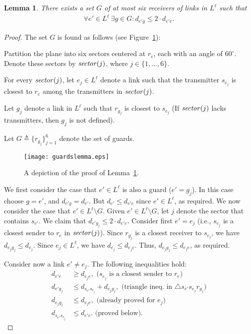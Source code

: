 \documentclass[11pt]{article}
\newenvironment{proof sketch}{\noindent {\bf Proof sketch:} }{\hfill \qed}
\newtheorem{lemma}{Lemma}
\newcommand{\sector}{\text{\emph{sector}}}
\newcommand{\eqdf}{\triangleq}
\begin{document}
\begin{lemma}\label{lem:guards}
  There exists a set $G$ of at most six receivers of links in
  $L^{\ell}$ such that
\begin{align*}
\forall e' \in L^{\ell}~ \exists g \in G : d_{e'g} \leq 2\cdot d_{e'e}.
\end{align*}
\end{lemma}
\begin{proof}
  The set $G$ is found as follows (see Figure~\ref{fig:guards1}):
  \begin{inparaenum}[(i)]
  \item Partition the plane into six sectors centered at $r_e$, each
    with an angle of $60^{\circ}$. Denote these sectors by
    $\sector(j)$, where $j \in \{1,\ldots,6\}$.
  \item For every $\sector(j)$, let $e_j \in L^{\ell}$ denote a link
    such that the transmitter $s_{e_j}$ is closest to $r_e$ among the
    transmitters in $\sector(j)$.
  \item Let $g_j$ denote a link in $L^{\ell}$ such that $r_{g_j}$ is
    closest to $s_{e_j}$ (If $\sector(j)$ lacks
    transmitters, then $g_j$ is not defined).
  \end{inparaenum}
  Let $G\eqdf\{r_{g_j}\}_{j=1}^6$ denote the set of guards.


\begin{figure}[H]
  \centering
    \texttt{[image: guardslemma.eps]}
    \caption{
    A depiction of the proof of Lemma~\ref{lem:guards}.
}
  \label{fig:guards1}
\end{figure}


We first consider the case that $e' \in L^{\ell}$ is also a guard ($e'=g_j$).
In this case choose $g=e'$, and $d_{e'g}=d_{e'}$. But $d_{e'} \leq d_{e'e}$ since $e' \in L^{\ell}$, as required.
We now consider the case that $e' \in L^{\ell} \setminus G$.
  Given $e'\in L^{\ell} \setminus G$, let $j$ denote the sector that
  contains $s_{e'}$.  We claim that $d_{e'g_j} \leq 2\cdot d_{e'e}$.
  Consider first $e'=e_j$ (i.e., $s_{e_j}$ is a closest sender to
  $r_e$ in $\sector(j)$).  Since $r_{g_j}$ is a closest receiver to
  $s_{e_j}$, we have $d_{e_jg_j} \leq d_{e_j}$.  Since $e_j\in
  L^{\ell}$, we have $d_{e_j} \leq d_{e_je}$.  Thus, $d_{e_jg_j}\leq
  d_{e_je}$, as required.

  Consider now a link $e' \neq e_j$.  The following
  inequalities hold:
  \begin{align}
\label{eq:1}    d_{e'e} &\geq d_{e_je}, \text{ ($s_{e_j}$ is a closest sender to $r_e$)}\\
\label{eq:2}    d_{e'g_j} &\leq d_{s_{e'}s_{e_j}}+ d_{e_jg_j}, \text{ (triangle ineq. in $\triangle s_{e'}s_{e_j}r_{g_j}$)}\\
\label{eq:3}    d_{e_jg_j} &\leq d_{e_je}, \text{ (already proved for $e_j$)}\\
\label{eq:4}   d_{s_{e'}s_{e_j}} &\leq d_{e'e}. \text{ (proved below)}.
  \end{align}


\end{proof}
\end{document}
